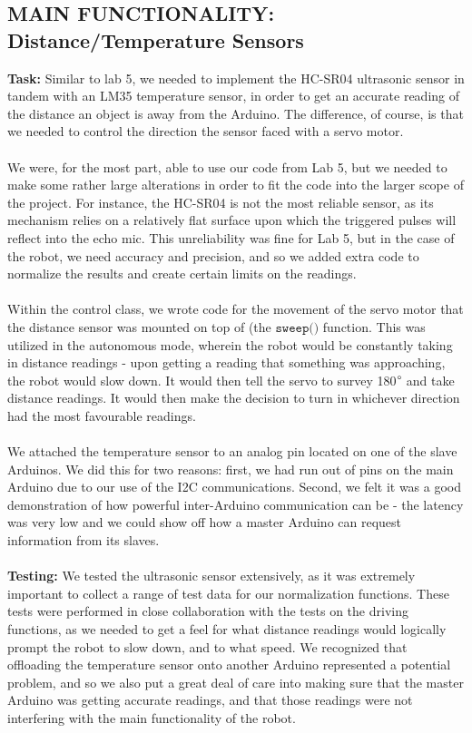 \documentclass[paper=a4, fontsize=11pt]{scrartcl}
\numberwithin{equation}{section}		%
\numberwithin{figure}{section}			%
\numberwithin{table}{section}				%
\begin{document}
{\subsection{MAIN FUNCTIONALITY: Distance/Temperature Sensors}
\textbf{Task: }Similar to lab 5, we needed to implement the HC-SR04 ultrasonic sensor in tandem with an LM35 temperature sensor, in order to get an accurate reading of the distance an object is away from the Arduino. The difference, of course, is that we needed to control the direction the sensor faced with a servo motor.
\\\\
We were, for the most part, able to use our code from Lab 5, but we needed to make some rather large alterations in order to fit the code into the larger scope of the project. For instance, the HC-SR04 is not the most reliable sensor, as its mechanism relies on a relatively flat surface upon which the triggered pulses will reflect into the echo mic. This unreliability was fine for Lab 5, but in the case of the robot, we need accuracy and precision, and so we added extra code to normalize the results and create certain limits on the readings. 
\\\\
Within the control class, we wrote code for the movement of the servo motor that the distance sensor was mounted on top of (the $\texttt{sweep()}$ function. This was utilized in the autonomous mode, wherein the robot would be constantly taking in distance readings - upon getting a reading that something was approaching, the robot would slow down. It would then tell the servo to survey 180$\degree$ and take distance readings. It would then make the decision to turn in whichever direction had the most favourable readings.
\\\\
We attached the temperature sensor to an analog pin located on one of the slave Arduinos. We did this for two reasons: first, we had run out of pins on the main Arduino due to our use of the I2C communications. Second, we felt it was a good demonstration of how powerful inter-Arduino communication can be - the latency was very low and we could show off how a master Arduino can request information from its slaves.
\\\\
\textbf{Testing: }We tested the ultrasonic sensor extensively, as it was extremely important to collect a range of test data for our normalization functions. These tests were performed in close collaboration with the tests on the driving functions, as we needed to get a feel for what distance readings would logically prompt the robot to slow down, and to what speed. We recognized that offloading the temperature sensor onto another Arduino represented a potential problem, and so we also put a great deal of care into making sure that the master Arduino was getting accurate readings, and that those readings were not interfering with the main functionality of the robot.
}
\end{document}

